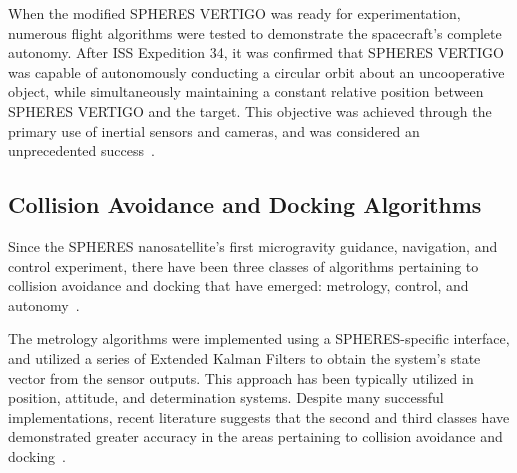 \documentclass[onecolumn,10pt]{jhwhw}
\begin{document}
When the modified SPHERES VERTIGO was ready for experimentation, numerous flight algorithms were tested to demonstrate the spacecraft's complete autonomy. After ISS Expedition 34, it was confirmed that SPHERES VERTIGO was capable of autonomously conducting a circular orbit about an uncooperative object, while simultaneously maintaining a constant relative position between SPHERES VERTIGO and the target. This objective was achieved through the primary use of inertial sensors and cameras, and was considered an unprecedented success~\cite{Vertigo2,Vertigo3}.

\subsection{Collision Avoidance and Docking Algorithms}
Since the SPHERES nanosatellite's first microgravity guidance, navigation, and control experiment, there have been three classes of algorithms pertaining to collision avoidance and docking that have emerged: metrology, control, and autonomy~\cite{SPHERES_form}.

The metrology algorithms were implemented using a SPHERES-specific interface, and utilized a series of Extended Kalman Filters to obtain the system's state vector from the sensor outputs. This approach has been typically utilized in position, attitude, and determination systems. Despite many successful implementations, recent literature suggests that the second and third classes have demonstrated greater accuracy in the areas pertaining to collision avoidance and docking~\cite{SPHERES_form}.
\end{document}
